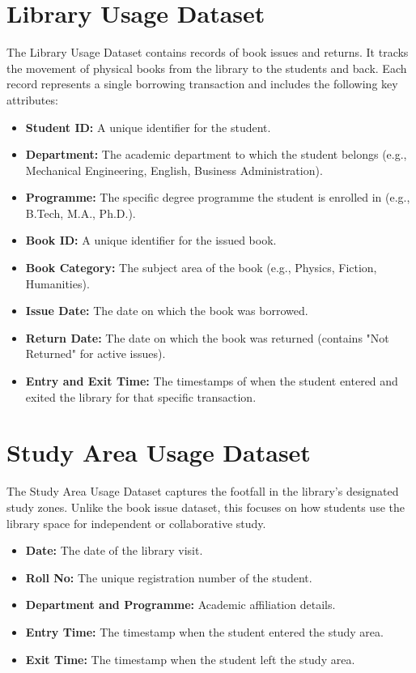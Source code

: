 \documentclass[12pt,a4paper]{report}
\begin{document}
\section{Library Usage Dataset}
The Library Usage Dataset contains records of book issues and returns. It tracks the movement of physical books from the library to the students and back. Each record represents a single borrowing transaction and includes the following key attributes:
\begin{itemize}
    \item \textbf{Student ID:} A unique identifier for the student.
    \item \textbf{Department:} The academic department to which the student belongs (e.g., Mechanical Engineering, English, Business Administration).
    \item \textbf{Programme:} The specific degree programme the student is enrolled in (e.g., B.Tech, M.A., Ph.D.).
    \item \textbf{Book ID:} A unique identifier for the issued book.
    \item \textbf{Book Category:} The subject area of the book (e.g., Physics, Fiction, Humanities).
    \item \textbf{Issue Date:} The date on which the book was borrowed.
    \item \textbf{Return Date:} The date on which the book was returned (contains "Not Returned" for active issues).
    \item \textbf{Entry and Exit Time:} The timestamps of when the student entered and exited the library for that specific transaction.
\end{itemize}

\section{Study Area Usage Dataset}
The Study Area Usage Dataset captures the footfall in the library's designated study zones. Unlike the book issue dataset, this focuses on how students use the library space for independent or collaborative study.
\begin{itemize}
    \item \textbf{Date:} The date of the library visit.
    \item \textbf{Roll No:} The unique registration number of the student.
    \item \textbf{Department and Programme:} Academic affiliation details.
    \item \textbf{Entry Time:} The timestamp when the student entered the study area.
    \item \textbf{Exit Time:} The timestamp when the student left the study area.
\end{itemize}
\end{document}
